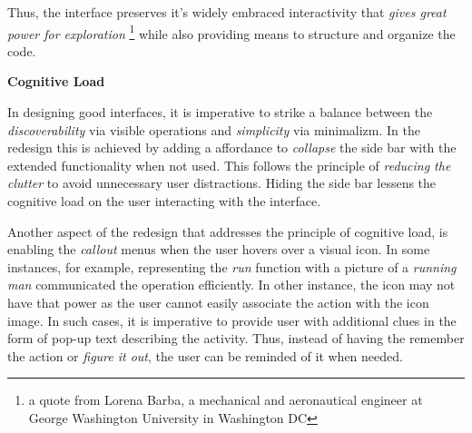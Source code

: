 \documentclass[12pt,letterpaper]{article}
\begin{document}
Thus, the interface preserves it's widely embraced interactivity that \textit{gives great power for exploration} \footnote{a quote from Lorena Barba, a  mechanical and aeronautical engineer at George Washington University in Washington DC} while also providing means to structure and organize the code.


\textbf{Cognitive Load}

In designing good interfaces, it is imperative to strike a balance between the \textit{discoverability} via visible operations and \textit{simplicity} via minimalizm. In the redesign this is achieved by adding a affordance to \textit{collapse} the side bar with the extended functionality when not used. This follows the principle of \textit{reducing the clutter} to avoid unnecessary user distractions. Hiding the side bar lessens the cognitive load on the user interacting with the interface. 

Another aspect of the redesign that addresses the principle of cognitive load, is enabling the \textit{callout} menus when the user hovers over a visual icon. In some instances, for example, representing the \textit{run} function with a picture of a \textit{running man} communicated the operation efficiently. In other instance, the icon may not have that power as the user cannot easily associate the action with the icon image. In such cases, it is imperative to provide user with additional clues in the form of pop-up text describing the activity. Thus, instead of having the remember the action or \textit{figure it out}, the user can be reminded of it when needed.  


 

\end{document}
